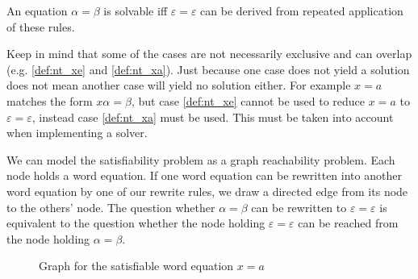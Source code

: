 An equation $\alpha = \beta$ is solvable iff $\varepsilon = \varepsilon$ can be derived from repeated application of these rules.

Keep in mind that some of the cases are not necessarily exclusive and can overlap (e.g. \ref{def:nt_xe} and \ref{def:nt_xa}). Just because one case does not yield a solution does not mean another case will yield no solution either. For example $x = a$ matches the form $x\alpha = \beta$, but case \ref{def:nt_xe} cannot be used to reduce $x = a$ to $\varepsilon = \varepsilon$, instead case \ref{def:nt_xa} must be used. This must be taken into account when implementing a solver.

We can model the satisfiability problem as a graph reachability problem. Each node holds a word equation. If one word equation can be rewritten into another word equation by one of our rewrite rules, we draw a directed edge from its node to the others' node. The question whether $\alpha = \beta$ can be rewritten to $\varepsilon = \varepsilon$ is equivalent to the question whether the node holding $\varepsilon = \varepsilon$ can be reached from the node holding $\alpha = \beta$.

\begin{figure}[H]
\begin{center}
\caption{Graph for the satisfiable word equation $x = a$}
\label{fig:nielsen-graph-sat}
\end{center}
\end{figure}

